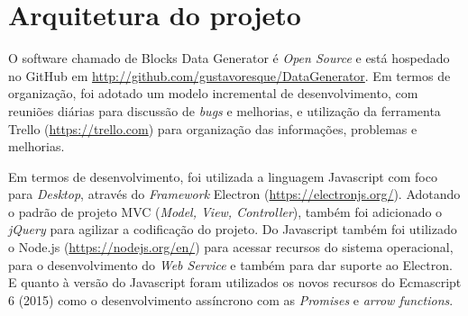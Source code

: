 \documentclass[
	12pt,				%
	openright,			%
	twoside,			%
	a4paper,			%
	english,			%
	brazil				%
	]{abntex2}
\begin{document}

		
\chapter{Arquitetura do projeto}\label{cap_trabalho_academico}

	O software chamado de Blocks Data Generator é \emph{Open Source} e está hospedado no GitHub em \url{http://github.com/gustavoresque/DataGenerator}.
	Em termos de organização, foi adotado um modelo incremental de desenvolvimento, com reuniões diárias para discussão de \emph{bugs} e melhorias, e utilização da ferramenta Trello (\url{https://trello.com}) para organização das informações, problemas e melhorias.
	\par
	Em termos de desenvolvimento, foi utilizada a linguagem Javascript com foco para \emph{Desktop}, através do \emph{Framework} Electron (\url{https://electronjs.org/}).
	Adotando o padrão de projeto MVC (\emph{Model, View, Controller}), também foi adicionado o \emph{jQuery} para agilizar a codificação do projeto.
	Do Javascript também foi utilizado o Node.js (\url{https://nodejs.org/en/}) para acessar recursos do sistema operacional, para o desenvolvimento do \emph{Web Service} e também para dar suporte ao Electron.
	E quanto à versão do Javascript foram utilizados os novos recursos do Ecmascript 6 (2015) como o desenvolvimento assíncrono com as \emph{Promises} e \emph{arrow functions}.
	
\end{document}
